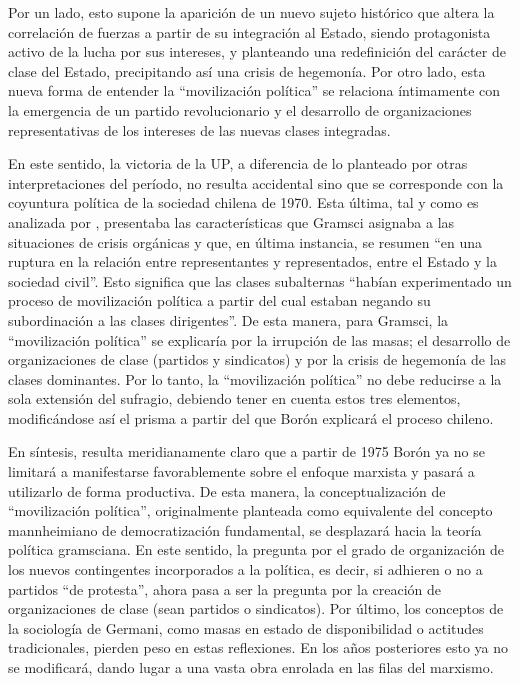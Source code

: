 {Por un lado, esto supone la aparición de un nuevo sujeto histórico que altera la correlación de fuerzas a partir de su integración al Estado, siendo protagonista activo de la lucha por sus intereses, y planteando una redefinición del carácter de clase del Estado, precipitando así una crisis de hegemonía. Por otro lado, esta nueva forma de entender la \enquote{movilización política} se relaciona íntimamente con la emergencia de un partido revolucionario y el desarrollo de organizaciones representativas de los intereses de las nuevas clases integradas.

En este sentido, la victoria de la UP, a diferencia de lo planteado por otras interpretaciones del período, no resulta accidental sino que se corresponde con la coyuntura política de la sociedad chilena de 1970. Esta última, tal y como es analizada por \textcite[75]{1574-BORON1975}, presentaba las características que Gramsci asignaba a las situaciones de crisis orgánicas y que, en última instancia, se resumen \enquote{en una ruptura en la relación entre representantes y representados, entre el Estado y la sociedad civil}. Esto significa que las clases subalternas \enquote{habían experimentado un proceso de movilización política a partir del cual estaban negando su subordinación a las clases dirigentes}. De esta manera, para Gramsci, la \enquote{movilización política} se explicaría por la irrupción de las masas; el desarrollo de organizaciones de clase (partidos y sindicatos) y por la crisis de hegemonía de las clases dominantes. Por lo tanto, la \enquote{movilización política} no debe reducirse a la sola extensión del sufragio, debiendo tener en cuenta estos tres elementos, modificándose así el prisma a partir del que Borón explicará el proceso chileno.

En síntesis, resulta meridianamente claro que a partir de 1975 Borón ya no se limitará a manifestarse favorablemente sobre el enfoque marxista y pasará a utilizarlo de forma productiva. De esta manera, la conceptualización de \enquote{movilización política}, originalmente planteada como equivalente del concepto mannheimiano de democratización fundamental, se desplazará hacia la teoría política gramsciana. En este sentido, la pregunta por el grado de organización de los nuevos contingentes incorporados a la política, es decir, si adhieren o no a partidos \enquote{de protesta}, ahora pasa a ser la pregunta por la creación de organizaciones de clase (sean partidos o sindicatos). Por último, los conceptos de la sociología de Germani, como masas en estado de disponibilidad o actitudes tradicionales, pierden peso en estas reflexiones. En los años posteriores esto ya no se modificará, dando lugar a una vasta obra enrolada en las filas del marxismo.

}
